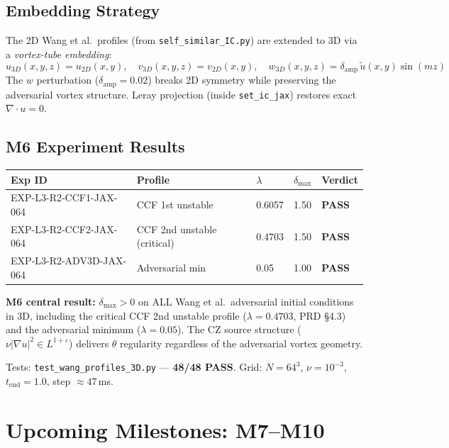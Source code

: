 \documentclass[11pt, a4paper]{article}
\theoremstyle{definition}
\theoremstyle{remark}
\newenvironment{keyresult}{%
  \begin{tcolorbox}[colback=tfgreen!6, colframe=tfgreen!60!black,
    title=\textbf{Key Result}, fonttitle=\small\bfseries,
    breakable, left=4pt, right=4pt, top=4pt, bottom=4pt]
}{%
  \end{tcolorbox}
}
\newcommand{\eps}{\varepsilon}
\newcommand{\lam}{\lambda}
\newcommand{\PASS}{\textcolor{passgreen}{\textbf{PASS}}}
\newcommand{\thet}{\theta}
\newcommand{\delt}{\delta}
\begin{document}
\subsection*{Embedding Strategy}

The 2D Wang et al.\ profiles (from \texttt{self\_similar\_IC.py}) are extended
to 3D via a \emph{vortex-tube embedding}:
\[
  u_{3D}(x,y,z) = u_{2D}(x,y), \quad
  v_{3D}(x,y,z) = v_{2D}(x,y), \quad
  w_{3D}(x,y,z) = \delta_{\mathrm{amp}}\,\tilde{u}(x,y)\sin(mz)
\]
The $w$ perturbation ($\delta_{\mathrm{amp}} = 0.02$) breaks 2D symmetry while
preserving the adversarial vortex structure. Leray projection (inside
\texttt{set\_ic\_jax}) restores exact $\nabla\cdot u = 0$.

\subsection*{M6 Experiment Results}

\begin{center}
\begin{tabular}{lllll}
\toprule
\textbf{Exp ID} & \textbf{Profile} & \boldmath$\lam$ &
  \boldmath$\delt_{\max}$ & \textbf{Verdict} \\
\midrule
EXP-L3-R2-CCF1-JAX-064 & CCF 1st unstable & 0.6057 & 1.50 & \PASS \\
EXP-L3-R2-CCF2-JAX-064 & CCF 2nd unstable (critical) & 0.4703 & 1.50 & \PASS \\
EXP-L3-R2-ADV3D-JAX-064 & Adversarial min & 0.05 & 1.00 & \PASS \\
\bottomrule
\end{tabular}
\end{center}

\begin{keyresult}
\textbf{M6 central result:} $\delt_{\max} > 0$ on ALL Wang et al.\ adversarial
initial conditions in 3D, including the critical CCF 2nd unstable profile
($\lam = 0.4703$, PRD \S4.3) and the adversarial minimum ($\lam = 0.05$).
The CZ source structure ($\nu|\nabla u|^2 \in L^{1+\eps}$) delivers $\thet$
regularity regardless of the adversarial vortex geometry.
\end{keyresult}

Tests: \texttt{test\_wang\_profiles\_3D.py} --- \textbf{48/48 PASS}.
Grid: $N=64^3$, $\nu=10^{-3}$, $t_{\mathrm{end}}=1.0$, step $\approx 47$\,ms.

\section{Upcoming Milestones: M7--M10}
\end{document}
